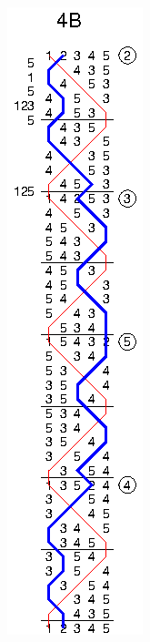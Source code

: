 \begin{figure}[t]
\begin{subfigure}{0.24\textwidth}
  \end{subfigure}
  \begin{subfigure}{0.24\textwidth}
    \includegraphics{figs/methods/single-hunt/4B}
  \end{subfigure}
\end{figure}
